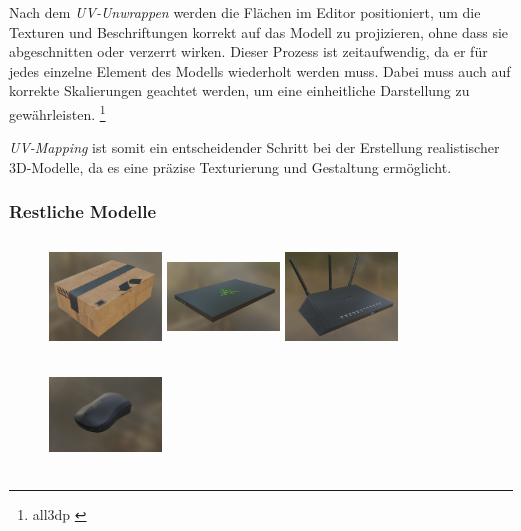 Nach dem \textit{UV-Unwrappen} werden die Flächen im Editor positioniert, um die Texturen und Beschriftungen korrekt auf das Modell zu projizieren, ohne dass sie abgeschnitten oder verzerrt wirken. Dieser Prozess ist zeitaufwendig, da er für jedes einzelne Element des Modells wiederholt werden muss. Dabei muss auch auf korrekte Skalierungen geachtet werden, um eine einheitliche Darstellung zu gewährleisten. \footnote{all3dp \cite{blender-uv-mapping-simply-explained}}

\textit{UV-Mapping} ist somit ein entscheidender Schritt bei der Erstellung realistischer 3D-Modelle, da es eine präzise Texturierung und Gestaltung ermöglicht.

\subsubsection{\label{sec:restlicheModelle}Restliche Modelle}
\begin{figure}[H]
    \centering
    \begin{minipage}[b]{0.20\textwidth}
        \centering
        \includegraphics[width=3cm,height=3cm]{images/package.png}
    \end{minipage}
    \hfill
    \begin{minipage}[b]{0.20\textwidth}
        \centering
        \includegraphics[width=3cm,height=3cm]{images/laptop.png}
    \end{minipage}
    \hfill
    \begin{minipage}[b]{0.20\textwidth}
        \centering
        \includegraphics[width=3cm,height=3cm]{images/router.png}
    \end{minipage}
    \hfill
    \begin{minipage}[b]{0.20\textwidth}
        \centering
        \includegraphics[width=3cm,height=3cm]{images/mouse.png}
    \end{minipage}
\end{figure}

